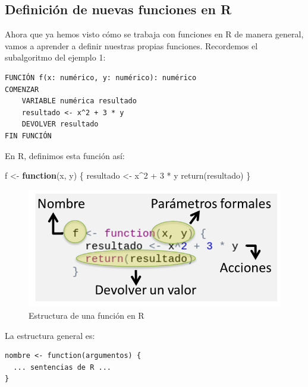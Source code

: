 \documentclass[
]{book}
\newenvironment{Shaded}{\begin{snugshade}}{\end{snugshade}}
\newcommand{\ControlFlowTok}[1]{\textcolor[rgb]{0.13,0.29,0.53}{\textbf{#1}}}
\newcommand{\DecValTok}[1]{\textcolor[rgb]{0.00,0.00,0.81}{#1}}
\newcommand{\FunctionTok}[1]{\textcolor[rgb]{0.00,0.00,0.00}{#1}}
\newcommand{\NormalTok}[1]{#1}
\newcommand{\OtherTok}[1]{\textcolor[rgb]{0.56,0.35,0.01}{#1}}
\newcommand{\SpecialCharTok}[1]{\textcolor[rgb]{0.00,0.00,0.00}{#1}}
\begin{document}
\hypertarget{definiciuxf3n-de-nuevas-funciones-en-r}{%
\subsection{Definición de nuevas funciones en R}\label{definiciuxf3n-de-nuevas-funciones-en-r}}

Ahora que ya hemos visto cómo se trabaja con funciones en R de manera general, vamos a aprender a definir nuestras propias funciones. Recordemos el subalgoritmo del ejemplo 1:

\begin{verbatim}
FUNCIÓN f(x: numérico, y: numérico): numérico
COMENZAR
    VARIABLE numérica resultado
    resultado <- x^2 + 3 * y
    DEVOLVER resultado
FIN FUNCIÓN
\end{verbatim}

En R, definimos esta función así:

\begin{Shaded}
\begin{Highlighting}[]
\NormalTok{f }\OtherTok{\textless{}{-}} \ControlFlowTok{function}\NormalTok{(x, y) \{}
\NormalTok{    resultado }\OtherTok{\textless{}{-}}\NormalTok{ x}\SpecialCharTok{\^{}}\DecValTok{2} \SpecialCharTok{+} \DecValTok{3} \SpecialCharTok{*}\NormalTok{ y}
    \FunctionTok{return}\NormalTok{(resultado)}
\NormalTok{\}}
\end{Highlighting}
\end{Shaded}

\begin{figure}

{\centering \includegraphics[width=0.8\linewidth]{images/03_funciones/31} 

}

\caption{Estructura de una función en R}\label{fig:unnamed-chunk-78}
\end{figure}

La estructura general es:

\begin{verbatim}
nombre <- function(argumentos) {
  ... sentencias de R ...
}
\end{verbatim}
\end{document}
